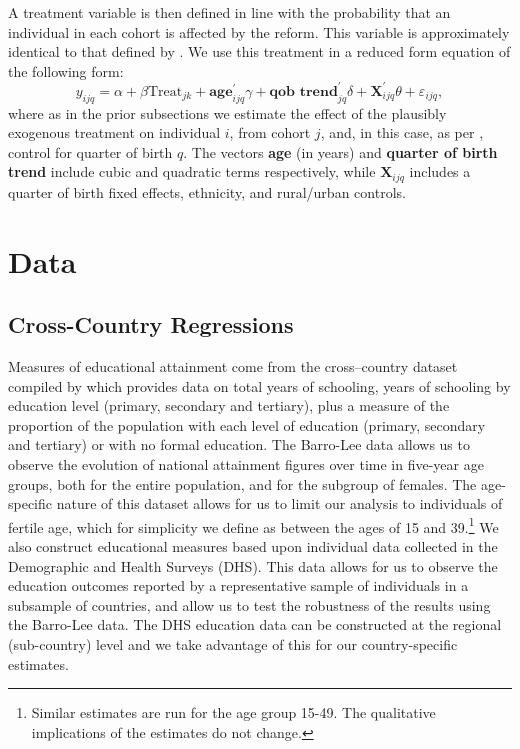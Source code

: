 \documentclass{article}[12pt,subeqn]
\begin{document}
\begin{spacing}{1.4}
A treatment variable is then defined in line with the probability that an individual in each cohort is affected
by the reform.  This variable is approximately identical to that defined by \citet{Chicoine2011}.  We use this 
treatment in a reduced form equation of the following form:
\begin{equation}
\label{eqn:Kenya}
 y_{ijq}=\alpha+\beta\text{Treat}_{jk}+\textbf{age}_{ijq}^\prime\gamma+\textbf{qob trend}_{jq}^\prime \delta +\textbf{X}^\prime_{ijq}\theta+\varepsilon_{ijq},
\end{equation}
where as in the prior subsections we estimate the effect of the plausibly exogenous treatment on individual
$i$, from cohort $j$, and, in this case, as per \citet{Chicoine2011}, control for quarter of birth $q$.  The
vectors \textbf{age} (in years) and \textbf{quarter of birth trend} include cubic and quadratic terms 
respectively, while $\mathbf{X}_{ijq}$ includes a quarter of birth fixed effects, ethnicity, and rural/urban
controls.

\section{Data}
\label{scn:data}
\subsection{Cross-Country Regressions}
\label{sscn:datacross}

Measures of educational attainment come from the cross--country dataset compiled by \citet{BarroLee2013, BarroLee2010} which provides data on
total years of schooling, years of schooling by education level (primary, secondary and tertiary), plus a measure of the
proportion of the population with each level of education (primary, secondary and tertiary) or with no formal education.  
The Barro-Lee data allows us to observe the evolution of national attainment figures over time in five-year age groups, both for 
the entire population, and for the subgroup of females. The age-specific nature of this dataset allows for us to limit our analysis 
to individuals of fertile age, which for simplicity we define as between the ages of 15 and 39.\footnote{Similar estimates are run 
for the age group 15-49. The qualitative implications of the estimates do not change.} We also construct educational measures based 
upon individual data collected in the Demographic and Health Surveys (DHS).  This data allows for us to observe the education 
outcomes reported by a representative sample of individuals in a subsample of countries, and allow us to test the robustness of the 
results using the Barro-Lee data. The DHS education data can be constructed at the regional (sub-country) level and we take advantage 
of this for our country-specific estimates.


\end{spacing}
\end{document}
